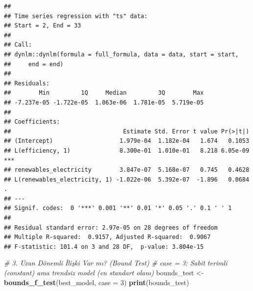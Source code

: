 \documentclass[
]{article}
\newenvironment{Shaded}{\begin{snugshade}}{\end{snugshade}}
\newcommand{\AttributeTok}[1]{\textcolor[rgb]{0.13,0.29,0.53}{#1}}
\newcommand{\CommentTok}[1]{\textcolor[rgb]{0.56,0.35,0.01}{\textit{#1}}}
\newcommand{\DecValTok}[1]{\textcolor[rgb]{0.00,0.00,0.81}{#1}}
\newcommand{\FunctionTok}[1]{\textcolor[rgb]{0.13,0.29,0.53}{\textbf{#1}}}
\newcommand{\NormalTok}[1]{#1}
\newcommand{\OtherTok}[1]{\textcolor[rgb]{0.56,0.35,0.01}{#1}}
\newcommand{\SpecialCharTok}[1]{\textcolor[rgb]{0.81,0.36,0.00}{\textbf{#1}}}
\begin{document}
\begin{Shaded}
\end{Shaded}

\begin{verbatim}
## 
## Time series regression with "ts" data:
## Start = 2, End = 33
## 
## Call:
## dynlm::dynlm(formula = full_formula, data = data, start = start, 
##     end = end)
## 
## Residuals:
##        Min         1Q     Median         3Q        Max 
## -7.237e-05 -1.722e-05  1.063e-06  1.781e-05  5.719e-05 
## 
## Coefficients:
##                                Estimate Std. Error t value Pr(>|t|)    
## (Intercept)                   1.979e-04  1.182e-04   1.674   0.1053    
## L(efficiency, 1)              8.300e-01  1.010e-01   8.218 6.05e-09 ***
## renewables_electricity        3.847e-07  5.168e-07   0.745   0.4628    
## L(renewables_electricity, 1) -1.022e-06  5.392e-07  -1.896   0.0684 .  
## ---
## Signif. codes:  0 '***' 0.001 '**' 0.01 '*' 0.05 '.' 0.1 ' ' 1
## 
## Residual standard error: 2.97e-05 on 28 degrees of freedom
## Multiple R-squared:  0.9157, Adjusted R-squared:  0.9067 
## F-statistic: 101.4 on 3 and 28 DF,  p-value: 3.804e-15
\end{verbatim}

\begin{Shaded}
\begin{Highlighting}[]
\CommentTok{\# 3. Uzun Dönemli İlişki Var mı? (Bound Test)}
\CommentTok{\# case = 3: Sabit terimli (constant) ama trendsiz model (en standart olanı)}
\NormalTok{bounds\_test }\OtherTok{\textless{}{-}} \FunctionTok{bounds\_f\_test}\NormalTok{(best\_model, }\AttributeTok{case =} \DecValTok{3}\NormalTok{)}
\FunctionTok{print}\NormalTok{(bounds\_test)}
\end{Highlighting}
\end{Shaded}
\end{document}
